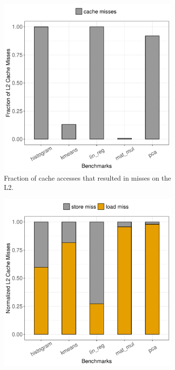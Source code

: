 \begin{figure}[htbp]
	\begin{subfigure}{0.33\textwidth}
		\centering
		\includegraphics[scale=0.4]{graphs/cache_misses_L2.pdf}
		\caption{Fraction of cache accesses that resulted in misses on the L2.}
	\end{subfigure}
	\begin{subfigure}{0.33\textwidth}
		\centering
		\includegraphics[scale=0.4]{graphs/all_misses_L2.pdf}

\end{subfigure}
\end{figure}

